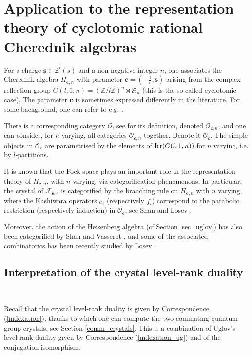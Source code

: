 \documentclass[twoside,12pt]{amsart}
\theoremstyle{plain}
\newcommand{\fS}{\mathfrak{S}}
\newcommand{\cF}{\mathcal{F}}
\newcommand{\cO}{\mathcal{O}}
\newcommand{\Z}{\mathbb{Z}}
\newcommand{\bc}{\mathbf{c}}
\newcommand{\bs}{\mathbf{s}}
\newcommand{\te}{\tilde{e}}
\newcommand{\tf}{\tilde{f}}
\newcommand{\Irr}{\text{\rm Irr}}
\theoremstyle{remark}
\begin{document}
\section{Application to the representation theory of cyclotomic rational Cherednik algebras}\label{cher}

For a charge $\bs\in\Z^l(s)$ and a non-negative integer $n$, one associates the Cherednik algebra $H_{\bc,n}$
with parameter $\bc = (-\frac{1}{e},\bs)$
arising from the complex reflection group $G(l,1,n)= (\Z/l\Z)^n \rtimes \fS_n$
(this is the so-called cyclotomic case).
The parameter $\bc$ is sometimes expressed differently in the literature.
For some background, one can refer to e.g. \cite{Shan2011}.

There is a corresponding category $\cO$, see \cite{GGOR2003} for its definition, 
denoted $\cO_{\bc,n}$, and one can consider, for $n$ varying, all categories $\cO_{\bc,n}$
together. Denote it $\cO_\bc$.
The simple objects in $\cO_\bc$ are parametrised by the elements of $\Irr( G(l,1,n) )$ for $n$ varying,
i.e. by $l$-partitions.

It is known that the Fock space plays an important role in the representation theory of 
$H_{\bc,n}$, with $n$ varying, via categorification phenomenons.
In particular, the crystal of $\cF_{\bs,e}$ is categorified by the branching rule on $H_{\bc,n}$ with $n$ varying,
where the Kashiwara operators $\te_i$ (respectively $\tf_i$) correspond to the parabolic restriction 
(respectively induction) in $\cO_\bc$, see Shan \cite[Theorem 6.3]{Shan2011} and Losev \cite[Theorem 5.1]{Losev2013}.

Moreover, the action of the Heisenberg algebra (cf Section \ref{sec_uglov})
has also been categorified by Shan and Vasserot \cite{ShanVasserot2012},
and some of the associated combinatorics has been recently studied by Losev \cite{Losev2015}.




\subsection{Interpretation of the crystal level-rank duality}\label{cher_level_rank}\

Recall that the crystal level-rank duality is given by Correspondence (\ref{indexation}),
thanks to which one can compute the two commuting quantum group crystals, see Section \ref{comm_crystals}.
This is a combination of Uglov's level-rank duality given by Correspondence (\ref{indexation_ug})
and of the conjugation isomorphism.
\end{document}
